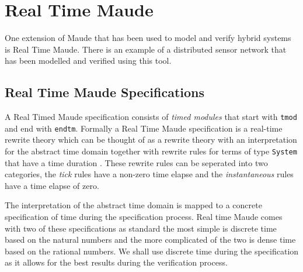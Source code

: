 \section{Real Time Maude}
One extension of Maude that has been used to model and verify hybrid systems is Real Time Maude. There is an example of a distributed sensor network that has been modelled and verified using this tool.
\subsection{Real Time Maude Specifications}
A Real Timed Maude specification consists of \emph{timed modules} that start with \texttt{tmod} and end with \texttt{endtm}. Formally a Real Time Maude specification is a real-time rewrite theory which can be thought of as a rewrite theory with an interpretation for the abstract time domain together with rewrite rules for terms of type \texttt{System} that have a time duration \cite{PO02}. These rewrite rules can be seperated into two categories, the \emph{tick} rules have a non-zero time elapse and the \emph{instantaneous} rules have a time elapse of zero.

The interpretation of the abstract time domain is mapped to a concrete specification of time during the specification process. Real time Maude comes with two of these specifications as standard the most simple  is discrete time based on the natural numbers and the more complicated of the two is dense time based on the rational numbers. We shall use discrete time during the specification as it allows for the best results during the verification process.

